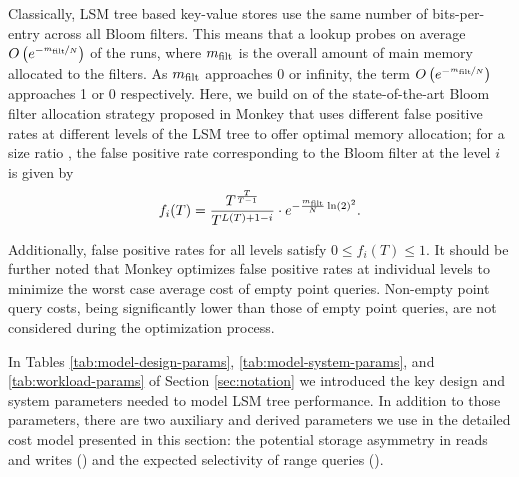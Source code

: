 Classically, LSM tree based key-value stores use the same number of 
    bits-per-entry across all Bloom filters. This means that a lookup probes 
    on average %
    $ O\left(e^{-\nicefrac{{{m_{\mathrm{filt}}}}}{N}}\right)$%
    of the runs, 
    where ${{m_{\mathrm{filt}}}}$ is the overall amount of main memory allocated to the 
    filters. 
As ${{m_{\mathrm{filt}}}}$ approaches 0 or infinity, the term 
    $O\left(e^{-\nicefrac{{{m_{\mathrm{filt}}}}}{N}}\right)$%
    approaches 1 or 0 
    respectively.  
Here, we build on of the state-of-the-art Bloom filter allocation 
    strategy proposed in Monkey \cite{Dayan2017,Dayan2018a} that uses different 
    false positive rates at different levels of the LSM tree to offer  
    optimal memory allocation; for a size ratio {\sizeratio}, the false positive rate 
    corresponding to the Bloom filter at the level $i$ is given by
\begin{equation}
\label{eq:bloom2}
    f_i(T) = \frac{T^{\frac{T}{T-1}}}{T^{L(T)+1-i}}\cdot e^{-\frac{{{m_{\mathrm{filt}}}}}{N}\ln(2)^2}.
\end{equation}

Additionally, false positive rates for all levels satisfy $0 \leq f_i(T) \leq 1$.
It should be further noted that Monkey optimizes false positive rates at
    individual levels to minimize the worst case average cost of empty point
    queries.
Non-empty point query costs, being significantly lower than those of empty point
    queries, are not considered during the optimization process.

In Tables \ref{tab:model-design-params}, \ref{tab:model-system-params},
    and \ref{tab:workload-params} of Section \ref{sec:notation} we introduced 
    the key design and system parameters needed to model LSM tree performance. 
In addition to those parameters, 
there are two auxiliary and derived parameters we use in the detailed cost model 
    presented in this section: the potential storage asymmetry in reads and writes (\asym) and 
    the expected selectivity of range queries (\querySel).



